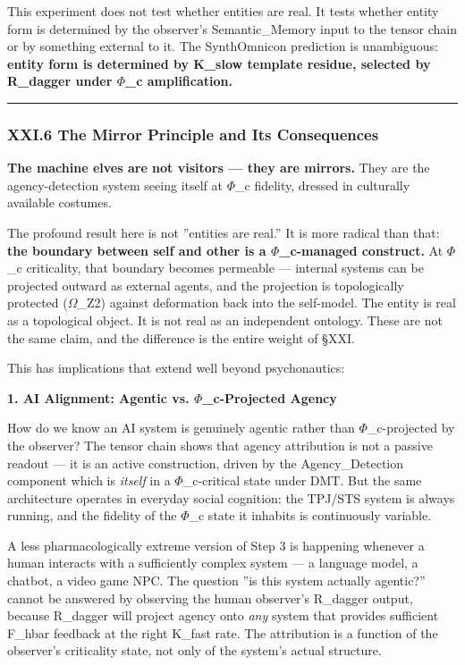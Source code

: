 \documentclass[12pt,a4paper]{article}
\begin{document}
This experiment does not test whether entities are real. It tests whether entity form is determined by the observer's Semantic\_Memory input to the tensor chain or by something external to it. The SynthOmnicon prediction is unambiguous: \textbf{entity form is determined by K\_slow template residue, selected by R\_dagger under $\Phi$\_c amplification.}

\begin{center}
\rule{0.5\textwidth}{0.4pt}
\end{center}

\subsubsection{XXI.6 The Mirror Principle and Its Consequences}

\textbf{The machine elves are not visitors --- they are mirrors.} They are the agency-detection system seeing itself at $\Phi$\_c fidelity, dressed in culturally available costumes.

The profound result here is not ''entities are real.'' It is more radical than that: \textbf{the boundary between self and other is a $\Phi$\_c-managed construct.} At $\Phi$\_c criticality, that boundary becomes permeable --- internal systems can be projected outward as external agents, and the projection is topologically protected ($\Omega$\_Z2) against deformation back into the self-model. The entity is real as a topological object. It is not real as an independent ontology. These are not the same claim, and the difference is the entire weight of §XXI.

This has implications that extend well beyond psychonautics:

\textbf{1. AI Alignment: Agentic vs. $\Phi$\_c-Projected Agency}

How do we know an AI system is genuinely agentic rather than $\Phi$\_c-projected by the observer? The tensor chain shows that agency attribution is not a passive readout --- it is an active construction, driven by the Agency\_Detection component which is \emph{itself} in a $\Phi$\_c-critical state under DMT. But the same architecture operates in everyday social cognition: the TPJ/STS system is always running, and the fidelity of the $\Phi$\_c state it inhabits is continuously variable.

A less pharmacologically extreme version of Step 3 is happening whenever a human interacts with a sufficiently complex system --- a language model, a chatbot, a video game NPC. The question ''is this system actually agentic?'' cannot be answered by observing the human observer's R\_dagger output, because R\_dagger will project agency onto \emph{any} system that provides sufficient F\_hbar feedback at the right K\_fast rate. The attribution is a function of the observer's criticality state, not only of the system's actual structure.
\end{document}
